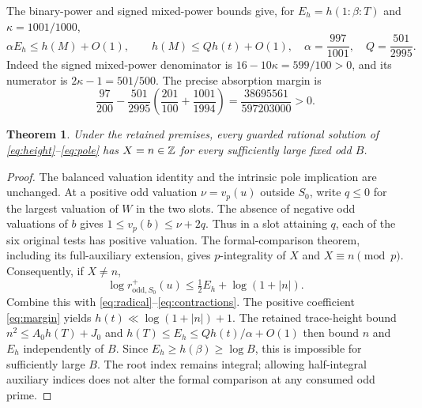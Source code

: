 \documentclass[11pt,a4paper]{article}
\newtheorem{theorem}{Theorem}[section]
\begin{document}
The binary-power and signed mixed-power bounds \cite{Signed} give, for
$E_h=h(1:\beta:T)$ and $\kappa=1001/1000$,
\begin{equation}\label{eq:contractions}
 \alpha E_h\le h(M)+O(1),\qquad h(M)\le Qh(t)+O(1),
 \quad \alpha=\frac{997}{1001},\quad Q=\frac{501}{2995}.
\end{equation}
Indeed the signed mixed-power denominator is
$16-10\kappa=599/100>0$, and its numerator is
$2\kappa-1=501/500$. The precise absorption margin is
\begin{equation}\label{eq:margin}
 \frac{97}{200}-\frac{501}{2995}
       \left(\frac{201}{100}+\frac{1001}{1994}\right)
           =\frac{38695561}{597203000}>0.
\end{equation}

\begin{theorem}\label{thm:sound}
Under the retained premises, every guarded rational solution of
\eqref{eq:height}--\eqref{eq:pole} has $X=n\in\mathbb Z$ for every
sufficiently large fixed odd $B$.
\end{theorem}
\begin{proof}
The balanced valuation identity and the intrinsic pole implication are
unchanged. At a positive odd valuation $\nu=v_p(u)$ outside $S_0$,
write $q\le0$ for the largest valuation of $W$ in the two slots. The
absence of negative odd valuations of $b$ gives
$1\le v_p(b)\le\nu+2q$. Thus in a slot attaining $q$, each of the
six original tests has positive valuation. The formal-comparison theorem,
including its full-auxiliary extension, gives $p$-integrality of $X$ and
$X\equiv n\pmod p$. Consequently, if $X\ne n$,
\[
 \log r^+_{\mathrm{odd},S_0}(u)
       \le\tfrac12 E_h+\log(1+|n|).
\]
Combine this with \eqref{eq:radical}--\eqref{eq:contractions}.
The positive coefficient \eqref{eq:margin} yields
$h(t)\ll\log(1+|n|)+1$. The retained trace-height bound
$n^2\le A_0 h(T)+J_0$ and
$h(T)\le E_h\le Qh(t)/\alpha+O(1)$ then bound $n$ and $E_h$
independently of $B$. Since $E_h\ge h(\beta)\ge\log B$, this
is impossible for sufficiently large $B$. The root index remains
integral; allowing half-integral auxiliary indices does not alter the
formal comparison at any consumed odd prime.
\end{proof}
\end{document}
